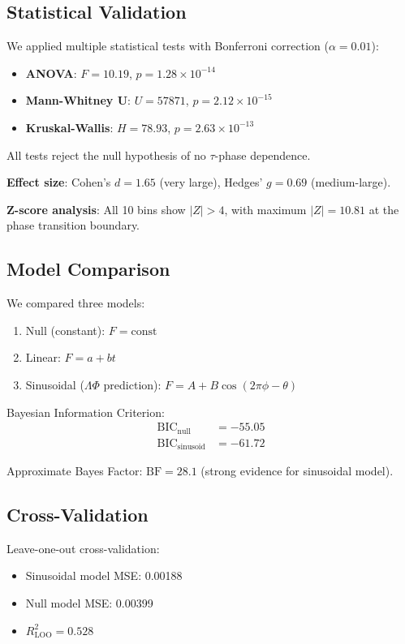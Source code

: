 \documentclass[twocolumn,prl,superscriptaddress,floatfix]{revtex4-2}
\begin{document}
\subsection{Statistical Validation}

We applied multiple statistical tests with Bonferroni correction ($\alpha = 0.01$):

\begin{itemize}
\item \textbf{ANOVA}: $F = 10.19$, $p = 1.28 \times 10^{-14}$
\item \textbf{Mann-Whitney U}: $U = 57871$, $p = 2.12 \times 10^{-15}$
\item \textbf{Kruskal-Wallis}: $H = 78.93$, $p = 2.63 \times 10^{-13}$
\end{itemize}

All tests reject the null hypothesis of no $\tau$-phase dependence.

\textbf{Effect size}: Cohen's $d = 1.65$ (very large), Hedges' $g = 0.69$ (medium-large).

\textbf{Z-score analysis}: All 10 bins show $|Z| > 4$, with maximum $|Z| = 10.81$ at the phase transition boundary.

\subsection{Model Comparison}

We compared three models:
\begin{enumerate}
\item Null (constant): $F = \text{const}$
\item Linear: $F = a + bt$
\item Sinusoidal ($\Lambda\Phi$ prediction): $F = A + B\cos(2\pi\phi - \theta)$
\end{enumerate}

Bayesian Information Criterion:
\begin{align}
\text{BIC}_{\text{null}} &= -55.05 \\
\text{BIC}_{\text{sinusoid}} &= -61.72
\end{align}

Approximate Bayes Factor: $\text{BF} = 28.1$ (strong evidence for sinusoidal model).

\subsection{Cross-Validation}

Leave-one-out cross-validation:
\begin{itemize}
\item Sinusoidal model MSE: 0.00188
\item Null model MSE: 0.00399
\item $R^2_{\text{LOO}} = 0.528$
\end{itemize}
\end{document}
